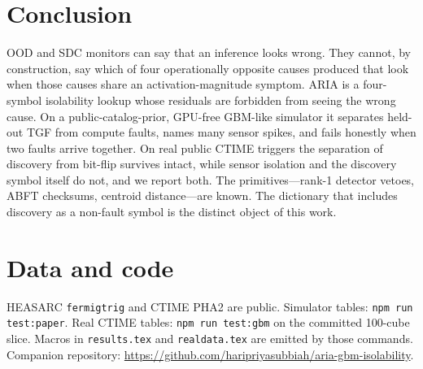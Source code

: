 \documentclass{ieeeaccess}
\begin{document}
\section{Conclusion}

OOD and SDC monitors can say that an inference looks wrong. They cannot, by construction, say which of four operationally opposite causes produced that look when those causes share an activation-magnitude symptom. ARIA is a four-symbol isolability lookup whose residuals are forbidden from seeing the wrong cause. On a public-catalog-prior, GPU-free GBM-like simulator it separates held-out TGF from compute faults, names many sensor spikes, and fails honestly when two faults arrive together. On \RealCubes{} real public CTIME triggers the separation of discovery from bit-flip survives intact, while sensor isolation and the discovery symbol itself do not, and we report both. The primitives---rank-1 detector vetoes, ABFT checksums, centroid distance---are known. The dictionary that includes discovery as a non-fault symbol is the distinct object of this work.

\section*{Data and code}
HEASARC \texttt{fermigtrig} and CTIME PHA2 are public. Simulator tables: \texttt{npm run test:paper}. Real CTIME tables: \texttt{npm run test:gbm} on the committed 100-cube slice. Macros in \texttt{results.tex} and \texttt{realdata.tex} are emitted by those commands. Companion repository: \url{https://github.com/haripriyasubbiah/aria-gbm-isolability}.
\end{document}
